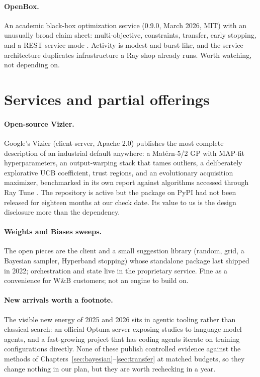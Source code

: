 \paragraph{OpenBox.}
An academic black-box optimization service (0.9.0, March 2026, MIT) with
an unusually broad claim sheet: multi-objective, constraints, transfer,
early stopping, and a REST service mode \citep{li2021openbox}. Activity
is modest and burst-like, and the service architecture duplicates
infrastructure a Ray shop already runs. Worth watching, not depending on.

\section{Services and partial offerings}

\paragraph{Open-source Vizier.}
Google's Vizier (client-server, Apache 2.0) publishes the most complete
description of an industrial default anywhere: a Mat\'ern-5/2 GP with
MAP-fit hyperparameters, an output-warping stack that tames outliers, a
deliberately explorative UCB coefficient, trust regions, and an
evolutionary acquisition maximizer, benchmarked in its own report against
algorithms accessed through Ray Tune \citep{song2022ossvizier,
song2024vizier}. The repository is active but the package on PyPI had not
been released for eighteen months at our check date. Its value to us is
the design disclosure more than the dependency.

\paragraph{Weights and Biases sweeps.}
The open pieces are the client and a small suggestion library (random,
grid, a Bayesian sampler, Hyperband stopping) whose standalone package
last shipped in 2022; orchestration and state live in the proprietary
service. Fine as a convenience for W\&B customers; not an engine to build
on.

\paragraph{New arrivals worth a footnote.}
The visible new energy of 2025 and 2026 sits in agentic tooling rather
than classical search: an official Optuna server exposing studies to
language-model agents, and a fast-growing project that has coding agents
iterate on training configurations directly. None of these publish
controlled evidence against the methods of
Chapters~\ref{sec:bayesian}--\ref{sec:transfer} at matched budgets, so
they change nothing in our plan, but they are worth rechecking in a year.


